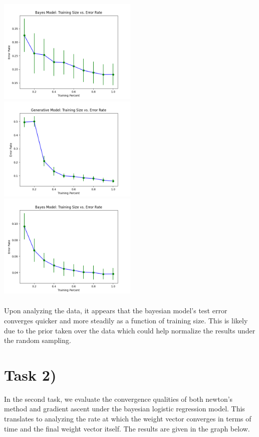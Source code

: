 \documentclass{article}
\begin{document}
\includegraphics[width=0.5\textwidth]{../output/bayes-B.png}
\includegraphics[width=0.5\textwidth]{../output/generative-USPS.png}
\includegraphics[width=0.5\textwidth]{../output/bayes-USPS.png}
\\ \\
Upon analyzing the data, it appears that the bayesian model's test error converges quicker and more steadily as a function of training size. This is likely due to the prior taken over the data which could help normalize the results under the random sampling.

\section*{Task 2)}

In the second task, we evaluate the convergence qualities of both newton's method and gradient ascent under the bayesian logistic regression model. This translates to analyzing the rate at which the weight vector converges in terms of time and the final weight vector itself. The results are given in the graph below.
\end{document}
